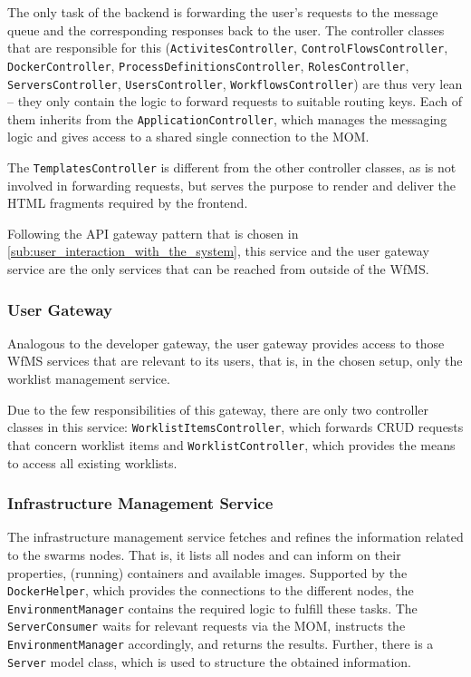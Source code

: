    The only task of the backend is forwarding the user's requests to the message queue and the corresponding responses back to the user. The controller classes that are responsible for this (\texttt{ActivitesController}, \texttt{ControlFlowsController}, \texttt{DockerController}, \texttt{ProcessDefinitionsController}, \texttt{RolesController}, \texttt{ServersController}, \texttt{UsersController}, \texttt{WorkflowsController}) are thus very lean -- they only contain the logic to forward requests to suitable routing keys. Each of them inherits from the \texttt{ApplicationController}, which manages the messaging logic and gives access to a shared single connection to the \ac{MOM}.


    The \texttt{TemplatesController} is different from the other controller classes, as is not involved in forwarding requests, but serves the purpose to render and deliver the \ac{HTML} fragments required by the frontend.

    Following the API gateway pattern that is chosen in \ref{sub:user_interaction_with_the_system}, this service and the user gateway service are the only services that can be reached from outside of the \ac{WfMS}.

  \subsubsection{User Gateway} %
    \label{subs:user_gateway}
    Analogous to the developer gateway, the user gateway provides access to those \ac{WfMS} services that are relevant to its users, that is, in the chosen setup, only the worklist management service.

    Due to the few responsibilities of this gateway, there are only two controller classes in this service: \texttt{WorklistItemsController}, which forwards \ac{CRUD} requests that concern worklist items and \texttt{WorklistController}, which provides the means to access all existing worklists.

  \subsubsection{Infrastructure Management Service} %
    \label{subs:environment_management_service}
    The infrastructure management service fetches and refines the information related to the swarms nodes.
    That is, it lists all nodes and can inform on their properties, (running) containers and available images.
    Supported by the \texttt{DockerHelper}, which provides the connections to the different nodes, the \texttt{EnvironmentManager} contains the required logic to fulfill these tasks. The \texttt{ServerConsumer} waits for relevant requests via the \ac{MOM}, instructs the \texttt{EnvironmentManager} accordingly, and returns the results. Further, there is a \texttt{Server} model class, which is used to structure the obtained information.

